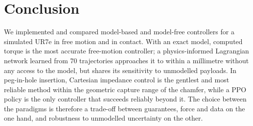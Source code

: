 \documentclass[conference]{IEEEtran}
\begin{document}
\section{Conclusion}
We implemented and compared model-based and model-free controllers for a simulated UR7e in free motion and in contact. With an exact model, computed torque is the most accurate free-motion controller; a physics-informed Lagrangian network learned from 70 trajectories approaches it to within a millimetre without any access to the model, but shares its sensitivity to unmodelled payloads. In peg-in-hole insertion, Cartesian impedance control is the gentlest and most reliable method within the geometric capture range of the chamfer, while a PPO policy is the only controller that succeeds reliably beyond it. The choice between the paradigms is therefore a trade-off between guarantees, force and data on the one hand, and robustness to unmodelled uncertainty on the other.



\end{document}
